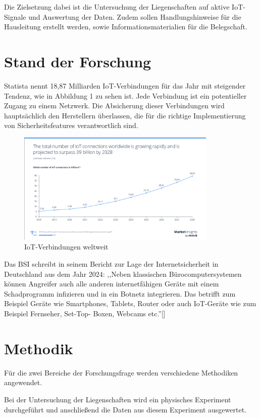 \documentclass[12pt, a4paper, onecolumn, oneside, toc=bibliographynumbered, liststotoc]{scrartcl} %
\begin{document}
Die Zielsetzung dabei ist die Untersuchung der Liegenschaften auf aktive IoT-Signale und Auswertung der Daten. Zudem sollen Handlungshinweise für die Hausleitung erstellt werden, sowie Informationsmaterialien für die Belegschaft.

	\section{Stand der Forschung}
Statista nennt 18,87 Milliarden IoT-Verbindungen für das Jahr mit steigender Tendenz, wie in Abbildung 1 zu sehen ist. Jede Verbindung ist ein potentieller Zugang zu einem Netzwerk. Die Absicherung dieser Verbindungen wird hauptsächlich den Herstellern überlassen, die für die richtige Implementierung von Sicherheitsfeatures verantwortlich sind.

\begin{figure}[H] 
\centering
\includegraphics[width=0.85\textwidth]{Statista_iot.png}
\caption{IoT-Verbindungen weltweit}
\end{figure}

Das BSI schreibt in seinem Bericht zur Lage der Internetsicherheit in Deutschland aus dem Jahr 2024: ,,Neben klassischen Bürocomputersystemen können Angreifer auch alle anderen internetfähigen Geräte mit einem Schadprogramm infizieren und in ein Botnetz integrieren. Das betrifft zum Beispiel Geräte wie Smartphones, Tablets, Router oder auch IoT-Geräte wie zum Beispiel Fernseher, Set-Top- Boxen, Webcams etc.''[\cite[15]{BundesamtfurSicherheitinderInformationstechnik.20241125}]
	
	\section{Methodik}
Für die zwei Bereiche der Forschungsfrage werden verschiedene Methodiken angewendet.

Bei der Untersuchung der Liegenschaften wird ein physisches Experiment durchgeführt und anschließend die Daten aus diesem Experiment ausgewertet.
\end{document}
